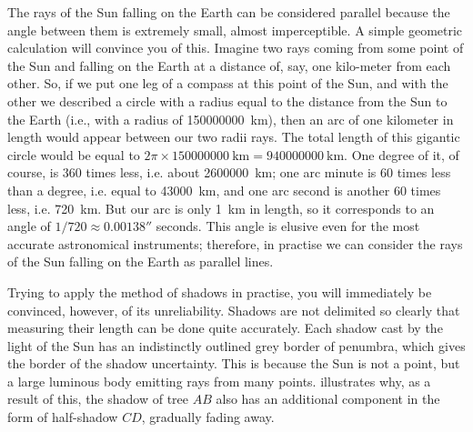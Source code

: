The rays of the Sun falling on the Earth can be considered parallel because the angle between them is extremely small, almost imperceptible. A simple geometric calculation will convince you of this. Imagine two rays coming from some point of the Sun and falling on the Earth at a distance of, say, one kilo-meter from each other. So, if we put one leg of a compass at this point of the Sun, and with the other we described a circle with a radius equal to the distance from the Sun to the Earth (i.e., with a radius of \SI{150000000}{\kilo\meter}), then an arc of one kilometer in length would appear between our two radii rays. The total length of this gigantic circle would be equal to $2 \pi \times \SI{150000000}{\kilo\meter} = \SI{940000000}{\kilo\meter}$. One degree of it, of course, is 360 times less, i.e. about \SI{2600000}{\kilo\meter}; one arc minute is 60 times less than a degree, i.e. equal to \SI{43000}{\kilo\meter}, and one arc second is another 60 times less, i.e. \SI{720}{\kilo\meter}. But our arc is only \SI{1}{\kilo\meter} in length, so it corresponds to an angle of $1/720 \approx \ang{;;0.00138}$ seconds. This angle is elusive even for the most accurate astronomical instruments; therefore, in practise we can consider the rays of the Sun falling on the Earth as parallel lines.

Trying to apply the method of shadows in practise, you will immediately be convinced, however, of its unreliability. Shadows are not delimited so clearly that measuring their length can be done quite accurately. Each shadow cast by the light of the Sun has an indistinctly outlined grey border of penumbra, which gives the border of the shadow uncertainty. This is because the Sun is not a point, but a large luminous body emitting rays from many points.  illustrates why, as a result of this, the shadow of tree $AB$ also has an additional component in the form of half-shadow $CD$, gradually fading away.

